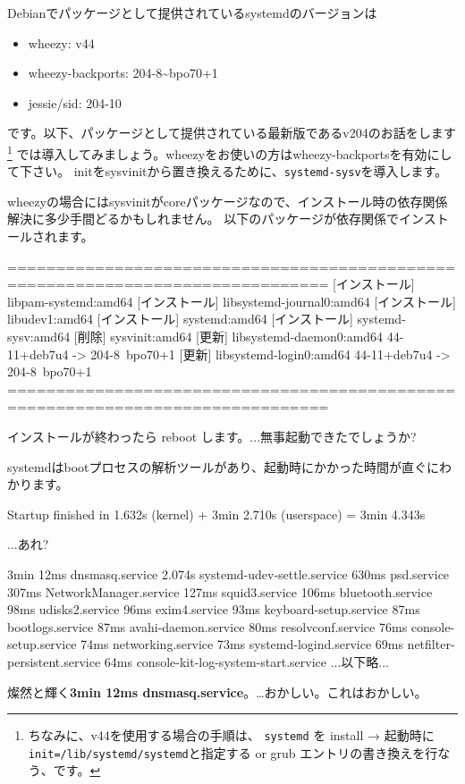 \documentclass[mingoth,a4paper]{jsarticle}
\begin{document}
Debianでパッケージとして提供されているsystemdのバージョンは
\begin{itemize}[topsep=1zw]
\item wheezy: v44
\item wheezy-backports: 204-8\~{}bpo70+1
\item jessie/sid: 204-10
\end{itemize}
です。以下、パッケージとして提供されている最新版であるv204のお話をします\footnote{%
  ちなみに、v44を使用する場合の手順は、
  \texttt{systemd} を install →
  起動時に \texttt{init=/lib/systemd/systemd}と指定する or grub エントリの書き換えを行なう、です。
}
では導入してみましょう。wheezyをお使いの方はwheezy-backportsを有効にして下さい。
initをsysvinitから置き換えるために、\texttt{systemd-sysv}を導入します。
\begin{commandline}
\end{commandline}
wheezyの場合にはsysvinitがcoreパッケージなので、インストール時の依存関係解決に多少手間どるかもしれません。
以下のパッケージが依存関係でインストールされます。
\begin{commandline}
===============================================================================
[インストール] libpam-systemd:amd64
[インストール] libsystemd-journal0:amd64
[インストール] libudev1:amd64
[インストール] systemd:amd64
[インストール] systemd-sysv:amd64
[削除] sysvinit:amd64
[更新] libsystemd-daemon0:amd64 44-11+deb7u4 -> 204-8~bpo70+1
[更新] libsystemd-login0:amd64 44-11+deb7u4 -> 204-8~bpo70+1
===============================================================================
\end{commandline}
インストールが終わったら reboot します。...無事起動できたでしょうか?

systemdはbootプロセスの解析ツールがあり、起動時にかかった時間が直ぐにわかります。
\begin{commandline}
Startup finished in 1.632s (kernel) + 3min 2.710s (userspace) = 3min 4.343s
\end{commandline}
...あれ?
\begin{commandline}
       3min 12ms dnsmasq.service
        2.074s systemd-udev-settle.service
         630ms psd.service
         307ms NetworkManager.service
         127ms squid3.service
         106ms bluetooth.service
          98ms udisks2.service
          96ms exim4.service
          93ms keyboard-setup.service
          87ms bootlogs.service
          87ms avahi-daemon.service
          80ms resolvconf.service
          76ms console-setup.service
          74ms networking.service
          73ms systemd-logind.service
          69ms netfilter-persistent.service
          64ms console-kit-log-system-start.service
          ...以下略...
\end{commandline}
燦然と輝く\textbf{3min 12ms dnsmasq.service}。…おかしい。これはおかしい。
\end{document}
